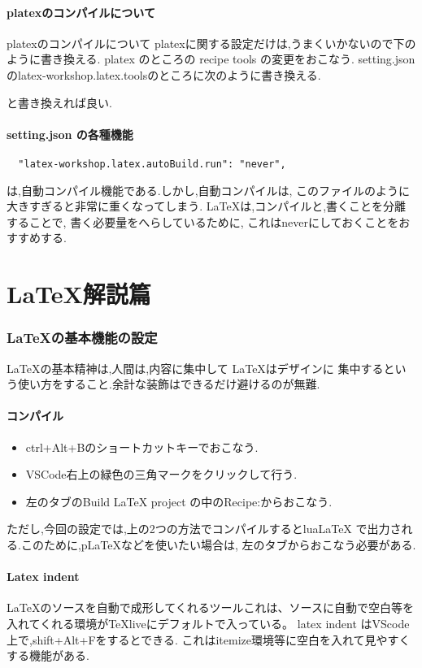 \documentclass{ltjsarticle}
\begin{document}
\subsection{platexのコンパイルについて}
platexのコンパイルについて
platexに関する設定だけは,うまくいかないので下のように書き換える.
platex のところの
recipe tools の変更をおこなう.
setting.jsonのlatex-workshop.latex.toolsのところに次のように書き換える.

と書き換えれば良い.
\subsection{setting.json の各種機能}
\begin{verbatim}
  "latex-workshop.latex.autoBuild.run": "never",
\end{verbatim}
は,自動コンパイル機能である.しかし,自動コンパイルは,
このファイルのように大きすぎると非常に重くなってしまう.
\LaTeX は,コンパイルと,書くことを分離することで,
書く必要量をへらしているために,
これはneverにしておくことをおすすめする.

\part{\LaTeX 解説篇}
\section{\LaTeX の基本機能の設定}
\LaTeX の基本精神は,人間は,内容に集中して \LaTeX はデザインに
集中するという使い方をすること.余計な装飾はできるだけ避けるのが無難.
\subsection{コンパイル}
\begin{itemize}
  \item ctrl+Alt+Bのショートカットキーでおこなう.
  \item VSCode右上の緑色の三角マークをクリックして行う.
  \item 左のタブのBuild LaTeX project の中のRecipe:からおこなう.
\end{itemize}
ただし,今回の設定では,上の2つの方法でコンパイルするとlua\LaTeX
で出力される.このために,pLaTeXなどを使いたい場合は,
左のタブからおこなう必要がある.
\subsection{Latex indent}
LaTeXのソースを自動で成形してくれるツールこれは、ソースに自動で空白等を
入れてくれる環境がTeXliveにデフォルトで入っている。
latex indent はVScode上で,shift+Alt+Fをするとできる.
これはitemize環境等に空白を入れて見やすくする機能がある.
\end{document}
